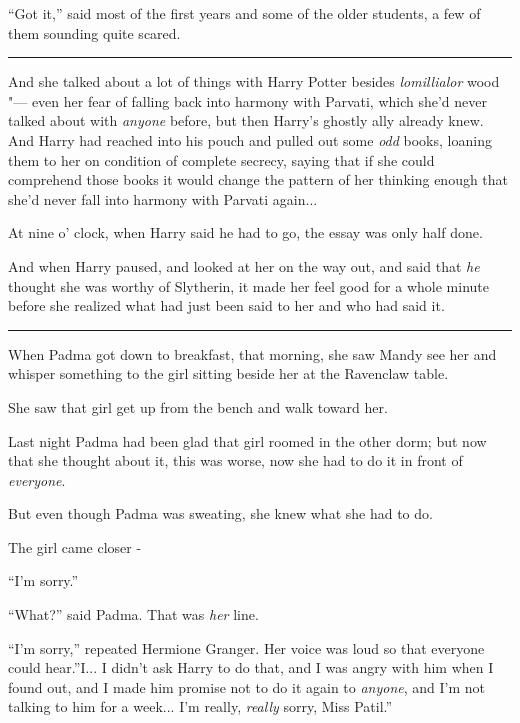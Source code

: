 ``Got it,'' said most of the first years and some of the older students,
a few of them sounding quite scared.

\begin{center}\rule{3in}{0.4pt}\end{center}

And she talked about a lot of things with Harry Potter besides
\emph{lomillialor} wood "--- even her fear of falling back into harmony
with Parvati, which she'd never talked about with \emph{anyone} before,
but then Harry's ghostly ally already knew. And Harry had reached into
his pouch and pulled out some \emph{odd} books, loaning them to her on
condition of complete secrecy, saying that if she could comprehend those
books it would change the pattern of her thinking enough that she'd
never fall into harmony with Parvati again...

At nine o' clock, when Harry said he had to go, the essay was only half
done.

And when Harry paused, and looked at her on the way out, and said that
\emph{he} thought she was worthy of Slytherin, it made her feel good for
a whole minute before she realized what had just been said to her and
who had said it.

\begin{center}\rule{3in}{0.4pt}\end{center}

When Padma got down to breakfast, that morning, she saw Mandy see her
and whisper something to the girl sitting beside her at the Ravenclaw
table.

She saw that girl get up from the bench and walk toward her.

Last night Padma had been glad that girl roomed in the other dorm; but
now that she thought about it, this was worse, now she had to do it in
front of \emph{everyone}.

But even though Padma was sweating, she knew what she had to do.

The girl came closer -

``I'm sorry.''

``What?'' said Padma. That was \emph{her} line.

``I'm sorry,'' repeated Hermione Granger. Her voice was loud so that
everyone could hear.''I... I didn't ask Harry to do that, and I was
angry with him when I found out, and I made him promise not to do it
again to \emph{anyone}, and I'm not talking to him for a week...
I'm really, \emph{really} sorry, Miss Patil.''

